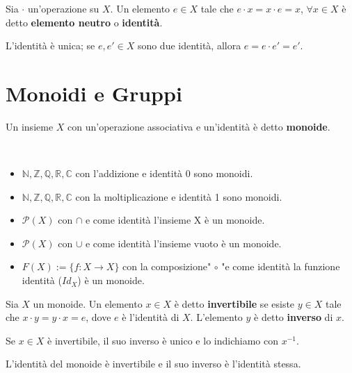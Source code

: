 \documentclass[../main.tex]{subfiles}
\begin{document}
\begin{definition}[Identità]
    Sia $\cdot$ un'operazione su $X$. Un elemento $e \in X$ tale che $e \cdot x = x \cdot e = x$, $\forall x \in X$ è detto \textbf{elemento neutro} o \textbf{identità}.
\end{definition}

L'identità è unica; se $e,e' \in X$ sono due identità, allora $e = e \cdot e' = e'$.

\section{Monoidi e Gruppi}

\begin{definition}[Monoide]
    Un insieme $X$ con un'operazione associativa e un'identità è detto \newline \textbf{monoide}.
\end{definition}

\begin{example}
    \
    \begin{itemize}
        \item $\mathbb{N,Z,Q,R,C}$ con l'addizione e identità 0 sono monoidi.
        \item $\mathbb{N,Z,Q,R,C}$ con la moltiplicazione e identità 1 sono monoidi.
        \item $\mathcal{P} (X)$ con $\cap$  e come identità l'insieme X è un monoide.
        \item $\mathcal{P} (X)$ con $\cup$  e come identità l'insieme vuoto è un monoide.
        \item $F(X):= \{f: X \rightarrow X\}$ con la composizione" $\circ$ "e come identità
              la funzione identità ($Id_X$) è un monoide.
    \end{itemize}
\end{example}

\begin{definition}[Inverso]
    Sia $X$ un monoide. Un elemento $x \in X$ è detto \textbf{invertibile} se esiste $y \in X$ tale che
    $x \cdot y = y \cdot x = e$, dove $e$ è l'identità di $X$. L'elemento $y$ è detto \textbf{inverso} di $x$.
\end{definition}

Se $x \in X$ è invertibile, il suo inverso è unico e lo indichiamo con $x^{-1}$.
\begin{remark}
    L'identità del monoide è invertibile e il suo inverso è l'identità stessa.
\end{remark}
\end{document}
